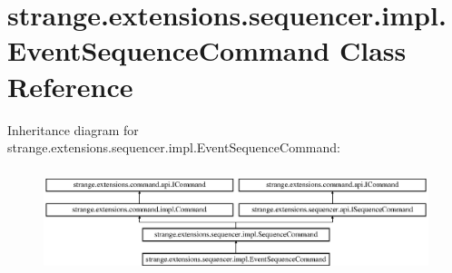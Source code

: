 \hypertarget{classstrange_1_1extensions_1_1sequencer_1_1impl_1_1_event_sequence_command}{\section{strange.\-extensions.\-sequencer.\-impl.\-Event\-Sequence\-Command Class Reference}
\label{classstrange_1_1extensions_1_1sequencer_1_1impl_1_1_event_sequence_command}
}
Inheritance diagram for strange.\-extensions.\-sequencer.\-impl.\-Event\-Sequence\-Command\-:\begin{figure}[H]
\begin{center}
\leavevmode
\includegraphics[height=3.102493cm]{classstrange_1_1extensions_1_1sequencer_1_1impl_1_1_event_sequence_command}
\end{center}
\end{figure}
